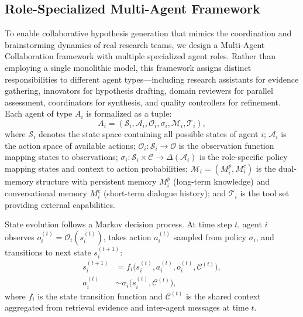 \documentclass[runningheads]{llncs}
\begin{document}
\subsection{Role-Specialized Multi-Agent Framework}
\label{sec:workflow}

To enable collaborative hypothesis generation that mimics the coordination and brainstorming dynamics of real research teams, we design a Multi-Agent Collaboration framework with multiple specialized agent roles. Rather than employing a single monolithic model, this framework assigns distinct responsibilities to different agent types---including research assistants for evidence gathering, innovators for hypothesis drafting, domain reviewers for parallel assessment, coordinators for synthesis, and quality controllers for refinement. Each agent of type $A_i$ is formalized as a tuple:
\begin{equation}
    A_i = (\mathcal{S}_i, \mathcal{A}_i, \mathcal{O}_i, \sigma_i, \mathcal{M}_i, \mathcal{T}_i),
\end{equation}
where $\mathcal{S}_i$ denotes the state space containing all possible states of agent $i$; $\mathcal{A}_i$ is the action space of available actions; $\mathcal{O}_i: \mathcal{S}_i \rightarrow \mathcal{O}$ is the observation function mapping states to observations; $\sigma_i: \mathcal{S}_i \times \mathcal{C} \rightarrow \Delta(\mathcal{A}_i)$ is the role-specific policy mapping states and context to action probabilities; $\mathcal{M}_i = (M_i^p, M_i^c)$ is the dual-memory structure with persistent memory $M_i^p$ (long-term knowledge) and conversational memory $M_i^c$ (short-term dialogue history); and $\mathcal{T}_i$ is the tool set providing external capabilities.

State evolution follows a Markov decision process. At time step $t$, agent $i$ observes $o_i^{(t)} = \mathcal{O}_i(s_i^{(t)})$, takes action $a_i^{(t)}$ sampled from policy $\sigma_i$, and transitions to next state $s_i^{(t+1)}$:
\begin{align}
    s_i^{(t+1)} &= f_i\big(s_i^{(t)}, a_i^{(t)}, o_i^{(t)}, \mathcal{C}^{(t)}\big), \\
    a_i^{(t)} &\sim \sigma_i\big(s_i^{(t)}, \mathcal{C}^{(t)}\big),
\end{align}
where $f_i$ is the state transition function and $\mathcal{C}^{(t)}$ is the shared context aggregated from retrieval evidence and inter-agent messages at time $t$.
\end{document}
